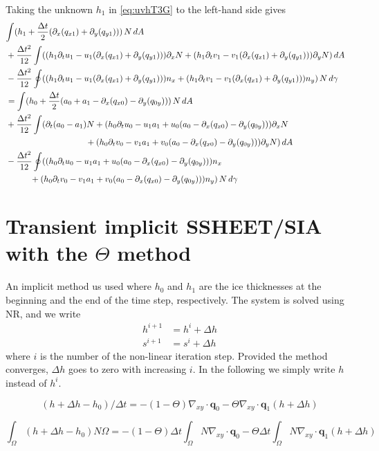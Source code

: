 \documentclass[10pt,a4paper]{book}
\newcommand{\p}{\partial}
\begin{document}
Taking the unknown $h_1$ in \eqref{eq:uvhT3G} to the left-hand side gives
\begin{align*}
\lefteqn{\int( h_1 + \frac{\Delta t}{2}( \p_x(q_{x1} ) + \p_y(q_{y1} ))) \,N\, dA }\\
&+ \frac{\Delta t^2}{12} \int (( h_1 \p_t u_1 - u_1 (\p_x (q_{x1})+\p_y (q_{y1}))) \p_x N +  (h_1 \p_t v_1 - v_1 (\p_x (q_{x1})+\p_y (q_{y1})))\p_y N )\, dA \\
&- \frac{\Delta t^2}{12} \oint (( h_1 \p_t u_1 - u_1 (\p_x (q_{x1})+\p_y (q_{y1}))) n_x + ( h_1 \p_t v_1 - v_1 (\p_x (q_{x1})+\p_y (q_{y1}))) n_y )\, N \, d\gamma\\
&=\int( h_0 + \frac{\Delta t}{2} (a_0 +a_1 -\p_x( q_{x0}) -\p_y ( q_{0y}) ))\,N\, dA \\
&+ \frac{\Delta t^2}{12} \int (  \p_t (a_0-a_1) N +( h_0 \p_t u_0 -u_1 a_1 + u_0 (a_0-\p_x (q_{x0})-\p_y (q_{0y}))) \p_x N \\
&  \hspace{3.3cm} +( h_0 \p_t v_0  -v_1 a_1 +v_0 (a_0-\p_x (q_{x0})-\p_y (q_{0y})))\p_y N )\, dA\\
&- \frac{\Delta t^2}{12} \oint (( h_0 \p_t u_0 -u_1 a_1 + u_0 (a_0-\p_x (q_{x0})-\p_y (q_{0y}))) n_x \\
&  \hspace{1cm} +( h_0 \p_t v_0 -v_1 a_1 + v_0 (a_0-\p_x (q_{x0})-\p_y (q_{0y}))) n_y )\, N \,d\gamma
\end{align*}



\section{Transient implicit SSHEET/SIA with the $\Theta$ method}

An implicit method us used where $h_0$ and $h_1$ are the ice
thicknesses at the beginning and the end of the time step,
respectively.  The system is solved using NR, and we write
\begin{align*}
 h^{i+1}&=h^i+\Delta h\\ 
 s^{i+1}&=s^i+\Delta h
\end{align*}
where $i$ is the number of the non-linear iteration step. Provided the method converges, $\Delta h$ goes to zero with
increasing $i$. In the following we simply write $h$ instead of $h^i$.

\[
(h+\Delta h -h_0)/\Delta t=-(1-\Theta) \nabla_{xy} \cdot \bm{q}_0 -  \Theta \nabla_{xy} \cdot \bm{q}_1(h+\Delta h)
\]


\begin{equation}
\int_{\Omega} (h+\Delta h -h_0) N \Omega= -(1-\Theta) \Delta t \int_{\Omega} N \nabla_{xy} \cdot \bm{q}_0 -  \Theta \Delta t \int_{\Omega} N \nabla_{xy} \cdot \bm{q}_1(h+\Delta h)
\label{eq:hvar}
\end{equation}
\end{document}
